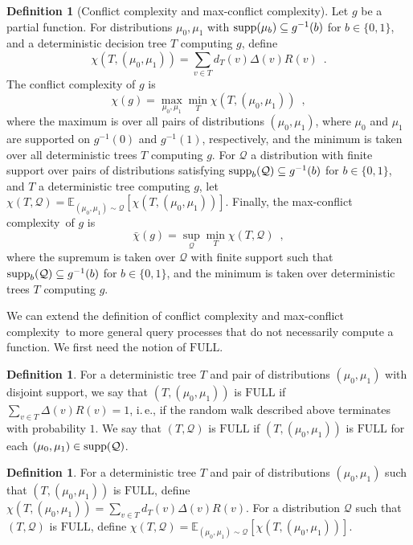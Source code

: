 \documentclass[11pt]{article}
\numberwithin{equation}{section}
\theoremstyle{definition}
\newtheorem{definition}[theorem]{Definition}
\theoremstyle{plain}
\newcommand{\ie}{i.\,e.}
\newcommand{\full}{\text{FULL}}
\newcommand\supp{\mathop{\rm supp}}
\newcommand{\clQ}{\mathcal{Q}}
\newcommand{\E}{\mathbb{E}}
\newcommand{\ccc}{max-conflict complexity}
\begin{document}
\begin{definition}[Conflict complexity and \ccc]
Let $g$ be a partial function.  For distributions $\mu_0,\mu_1$ with $\supp(\mu_b) \subseteq g^{-1}(b)$ for $b \in \{0,1\}$, and a deterministic decision tree $T$ computing 
$g$, define
\[
\chi(T, (\mu_0, \mu_1)) = \sum_{v \in T} d_T(v) \Delta(v) R(v) \enspace .
\]
The conflict complexity of $g$ is 
\[
\chi(g) = \max_{\mu_0,\mu_1} \min_T \chi(T, (\mu_0, \mu_1)) \enspace ,
\]
where the maximum is over all pairs of distributions $(\mu_0,\mu_1)$,
%
where $\mu_0$ and $\mu_1$ are %
supported on $g^{-1}(0)$ and $g^{-1}(1)$, respectively, and 
the minimum is taken over all deterministic trees $T$ computing $g$.
For $\clQ$ a distribution with finite support over pairs of distributions satisfying $\supp_b(\clQ) \subseteq g^{-1}(b)$ for $b \in \{0,1\}$, and $T$ a 
deterministic tree computing $g$, let 
$\chi(T,\clQ) = \E_{(\mu_0, \mu_1) \sim \clQ} [\chi(T, (\mu_0, \mu_1))]$.  Finally,
the \ccc \ of $g$ is 
\[
\bar \chi(g) = \sup_{\clQ} \min_T \chi(T, \clQ) \enspace ,
\]
where the supremum is taken over $\clQ$ with finite support such that $\supp_b(\clQ) \subseteq g^{-1}(b)$ for $b \in \{0,1\}$, and the minimum is taken over deterministic trees $T$ computing $g$.
\end{definition}

We can extend the definition of conflict complexity and \ccc \ to more general query processes that do not necessarily compute a function.  We first 
need the notion of $\full$.  
\begin{definition}
\label{def:chifull}
For a deterministic tree $T$ and pair of distributions $(\mu_0, \mu_1)$ with disjoint support, we say that $(T, (\mu_0, \mu_1))$ is $\full$ if $\sum_{v \in T} \Delta(v) R(v)=1$, \ie, 
if the random walk described above terminates with probability $1$.  We say that $(T, \clQ)$ is $\full$ if $(T, (\mu_0, \mu_1))$ is $\full$ for each $(\mu_0, \mu_1) \in \supp(\clQ)$.
\end{definition} 

\begin{definition}
For a deterministic tree $T$ and pair of distributions $(\mu_0, \mu_1)$ such that $(T, (\mu_0, \mu_1))$ is $\full$, define 
$\chi(T, (\mu_0, \mu_1))=\sum_{v \in T} d_T(v) \Delta(v) R(v)$.  For a distribution $\clQ$ such that $(T, \clQ)$ is $\full$, define 
$\chi(T,\clQ) = \E_{(\mu_0, \mu_1) \sim \clQ} [\chi(T, (\mu_0, \mu_1))]$.
\end{definition}
\end{document}
